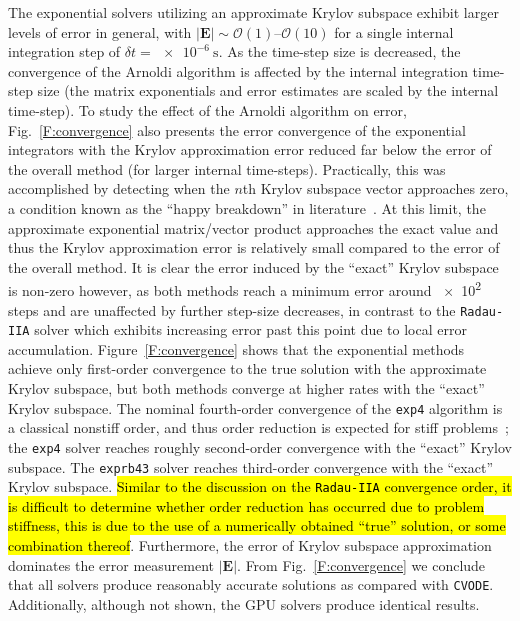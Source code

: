 \documentclass[preprint,review,11pt]{elsarticle}
\DeclareRobustCommand{\hlb}[1]{\sethlcolor{SkyBlue}\hl{#1}}
\begin{document}
The exponential solvers utilizing an approximate Krylov subspace exhibit larger levels of error in general, with $\left\lvert\textbf{E}\right\rvert \sim \mathcal{O}(1)\text{--}\mathcal{O}(10)$ for a single internal integration step of $\delta t = \SI{e-6}{\second}$.
As the time-step size is decreased, the convergence of the Arnoldi algorithm is affected by the internal integration time-step size (the matrix exponentials and error estimates are scaled by the internal time-step).
To study the effect of the Arnoldi algorithm on error, Fig.~\ref{F:convergence} also presents the error convergence of the exponential integrators with the Krylov approximation error reduced far below the error of the overall method (for larger internal time-steps).
Practically, this was accomplished by detecting when the $n$th Krylov subspace vector approaches zero, a condition known as the ``happy breakdown'' in literature~\cite{datta2010numerical}.
At this limit, the approximate exponential matrix\slash vector product approaches the exact value and thus the Krylov approximation error is relatively small compared to the error of the overall method.
It is clear the error induced by the ``exact'' Krylov subspace is non-zero however, as both methods reach a minimum error around \num{e2} steps and are unaffected by further step-size decreases, in contrast to the \texttt{Radau-IIA} solver which exhibits increasing error past this point due to local error accumulation.
Figure~\ref{F:convergence} shows that the exponential methods achieve only first-order convergence to the true solution with the approximate Krylov subspace, but both methods converge at higher rates with the ``exact'' Krylov subspace.
The nominal fourth-order convergence of the \texttt{exp4} algorithm is a classical nonstiff order, and thus order reduction is expected for stiff problems~\cite{ANU:7701740,Bisetti:2012jw}; the \texttt{exp4} solver reaches roughly second-order convergence with the ``exact'' Krylov subspace.
The \texttt{exprb43} solver reaches third-order convergence with the ``exact'' Krylov subspace.
\hlb{Similar to the discussion on the {\texttt{Radau-IIA}} convergence order, it is difficult to determine whether order reduction has occurred due to problem stiffness, this is due to the use of a numerically obtained ``true'' solution, or some combination thereof}.
Furthermore, the error of Krylov subspace approximation dominates the error measurement $\lvert\textbf{E}\rvert$.
From Fig.~\ref{F:convergence} we conclude that all solvers produce reasonably accurate solutions as compared with \texttt{CVODE}.
Additionally, although not shown, the GPU solvers produce identical results.
\end{document}

